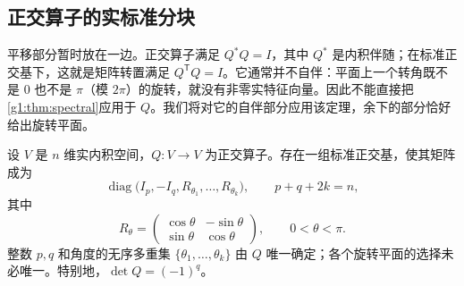 \subsection{正交算子的实标准分块}
\label{g1:subsec:0103:02}

平移部分暂时放在一边。正交算子满足 \(Q^*Q=I\)，其中 \(Q^*\) 是内积伴随；在标准正交基下，这就是矩阵转置满足 \(Q^{\mathsf T}Q=I\)。它通常并不自伴：平面上一个转角既不是 \(0\) 也不是 \(\pi\)（模 \(2\pi\)）的旋转，就没有非零实特征向量。因此不能直接把\cref{g1:thm:spectral}应用于 \(Q\)。我们将对它的自伴部分应用该定理，余下的部分恰好给出旋转平面。

\begin{theorem}
	\label{g1:thm:orthogonal-blocks}
	设 \(V\) 是 \(n\) 维实内积空间，\(Q\colon V\rightarrow V\) 为正交算子。存在一组标准正交基，使其矩阵成为
	\[
		\operatorname{diag}\bigl(I_p,-I_q,R_{\theta_1},\ldots,R_{\theta_k}\bigr),
		\qquad p+q+2k=n,
	\]
	其中
	\begin{equation}
		\label{g1:eq:rotation-block}
		R_\theta=
		\begin{pmatrix}\cos\theta&-\sin\theta\\
			\sin\theta&\cos\theta\end{pmatrix},
		\qquad 0<\theta<\pi.
	\end{equation}
	整数 \(p,q\) 和角度的无序多重集 \(\{\theta_1,\ldots,\theta_k\}\) 由 \(Q\) 唯一确定；各个旋转平面的选择未必唯一。特别地，\(\det Q=(-1)^q\)。
\end{theorem}

